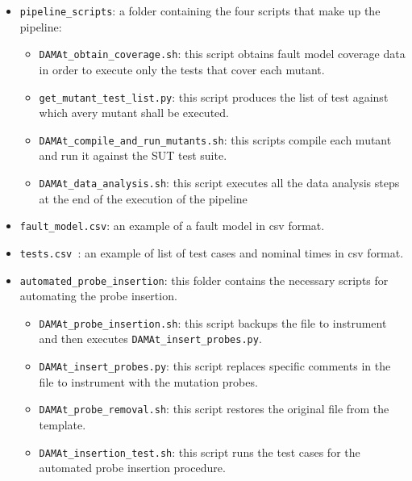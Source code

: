 \begin{itemize}
{\begin{itemize}
\begin{itemize}
\begin{itemize}
			\item \texttt{get\_operator\_coverage.py}: this script analizes the results of the operator coverage.
			\item \texttt{get\_stats.py}: this script produces statistics from the mutants' execution.
			\item \texttt{get\_final\_results.py}: this script produces a summary of the execution of \DAMA.
		\end{itemize}%
		\item \texttt{pipeline\_scripts}: a folder containing the four scripts that make up the \DAMA pipeline:
		\begin{itemize}%
			\item \texttt{DAMAt\_obtain\_coverage.sh}: this script obtains fault model coverage data in order to execute only the tests that cover each mutant.
			\item \texttt{get\_mutant\_test\_list.py}: this script produces the list of test against which avery mutant shall be executed.
			\item \texttt{DAMAt\_compile\_and\_run\_mutants.sh}: this scripts compile each mutant and run it against the SUT test suite.
			\item \texttt{DAMAt\_data\_analysis.sh}: this script executes all the data analysis steps at the end of the execution of the \DAMA pipeline
		\end{itemize}%
		\item \texttt{fault\_model.csv}: an example of a \DAMA fault model in csv format.
		\item \texttt{tests.csv }: an example of list of test cases and nominal times in csv format.
		\item \texttt{automated\_probe\_insertion}: this folder contains the necessary scripts for automating the probe insertion.
		\begin{itemize}
			\item \texttt{DAMAt\_probe\_insertion.sh}: this script backups the file to instrument and then executes \texttt{DAMAt\_insert\_probes.py}.
			\item \texttt{DAMAt\_insert\_probes.py}: this script replaces specific comments in the file to instrument with the mutation probes.
			\item \texttt{DAMAt\_probe\_removal.sh}: this script restores the original file from the template.
			\item \texttt{DAMAt\_insertion\_test.sh}: this script runs the test cases for the automated probe insertion procedure.

\end{itemize}
\end{itemize}
\end{itemize}}
\end{itemize}

